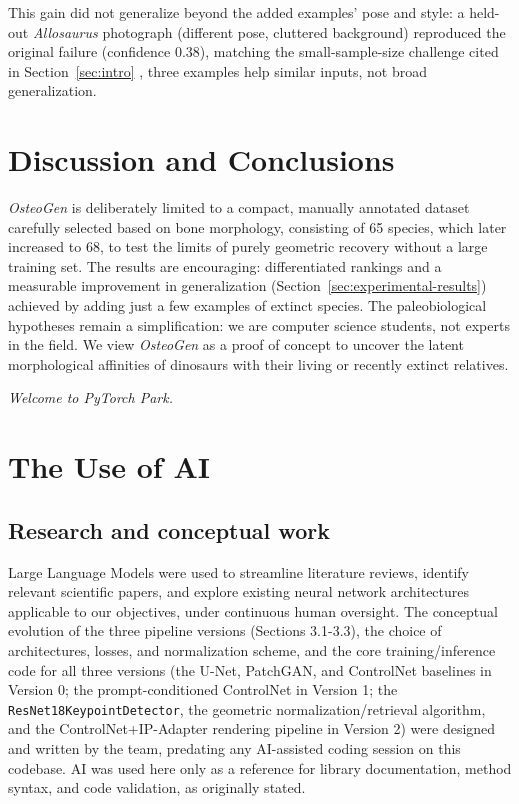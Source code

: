 \documentclass{article}
\begin{document}
This gain did not generalize beyond the added examples' pose and style: a held-out \textit{Allosaurus} photograph (different pose, cluttered background) reproduced the original failure (confidence 0.38), matching the small-sample-size challenge cited in Section~\ref{sec:intro} \cite{AI_Paleontology}, three examples help similar inputs, not broad generalization.

\section{Discussion and Conclusions}
\textit{OsteoGen} is deliberately limited to a compact, manually annotated dataset carefully selected based on bone morphology, consisting of 65 species, which later increased to 68, to test the limits of purely geometric recovery without a large training set. The results are encouraging: differentiated rankings and a measurable improvement in generalization (Section~\ref{sec:experimental-results}) achieved by adding just a few examples of extinct species. The paleobiological hypotheses remain a simplification: we are computer science students, not experts in the field. We view \textit{OsteoGen} as a proof of concept to uncover the latent morphological affinities of dinosaurs with their living or recently extinct relatives.

\textit{Welcome to PyTorch Park.}


\section{The Use of AI}
\label{sec:ai-use}

\subsection{Research and conceptual work}
Large Language Models were used to streamline literature reviews, identify relevant scientific papers, and explore existing neural network architectures applicable to our objectives, under continuous human oversight. The conceptual evolution of the three pipeline versions (Sections 3.1-3.3), the choice of architectures, losses, and normalization scheme, and the core training/inference code for all three versions (the U-Net, PatchGAN, and ControlNet baselines in Version 0; the prompt-conditioned ControlNet in Version 1; the \texttt{ResNet18KeypointDetector}, the geometric normalization/retrieval algorithm, and the ControlNet+IP-Adapter rendering pipeline in Version 2) were designed and written by the team, predating any AI-assisted coding session on this codebase. AI was used here only as a reference for library documentation, method syntax, and code validation, as originally stated.
\end{document}
